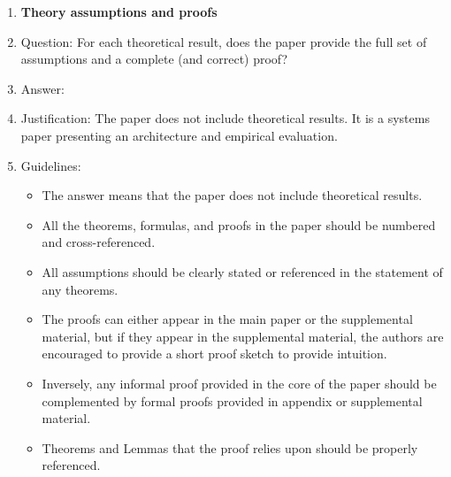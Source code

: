 \documentclass{article}
\begin{document}
\begin{enumerate}
\item {\bf Theory assumptions and proofs}
    \item[] Question: For each theoretical result, does the paper provide the full set of assumptions and a complete (and correct) proof?
    \item[] Answer: \answerNA{}
    \item[] Justification: The paper does not include theoretical results. It is a systems paper presenting an architecture and empirical evaluation.
    \item[] Guidelines:
    \begin{itemize}
        \item The answer \answerNA{} means that the paper does not include theoretical results. 
        \item All the theorems, formulas, and proofs in the paper should be numbered and cross-referenced.
        \item All assumptions should be clearly stated or referenced in the statement of any theorems.
        \item The proofs can either appear in the main paper or the supplemental material, but if they appear in the supplemental material, the authors are encouraged to provide a short proof sketch to provide intuition. 
        \item Inversely, any informal proof provided in the core of the paper should be complemented by formal proofs provided in appendix or supplemental material.
        \item Theorems and Lemmas that the proof relies upon should be properly referenced. 
    \end{itemize}


\end{enumerate}
\end{document}
